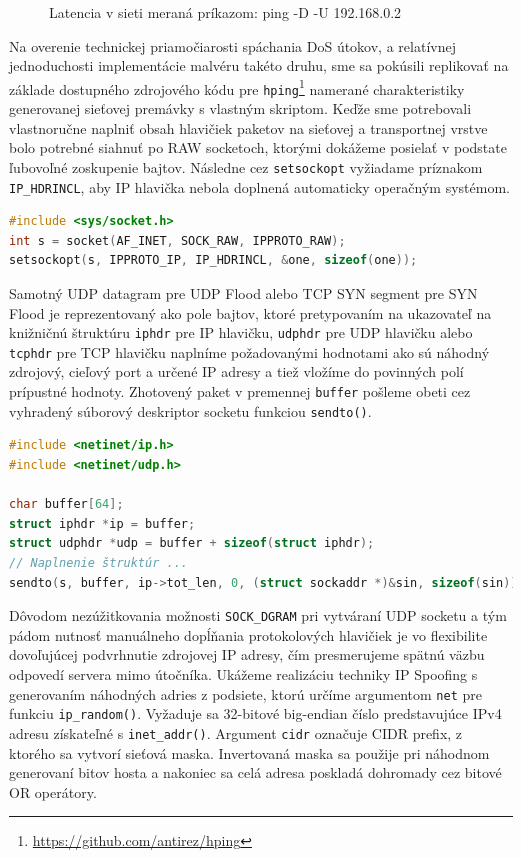 \documentclass[12pt, a4paper]{article}
\begin{document}
\begin{figure}[h!]
\begin{subfigure}[t]{.32\textwidth}
	\end{subfigure}
	\caption{Latencia v sieti meraná príkazom: ping -D -U 192.168.0.2}
	\label{latency-graphs}
\end{figure}

Na overenie technickej priamočiarosti spáchania DoS útokov, a relatívnej jednoduchosti
implementácie malvéru takéto druhu, sme sa pokúsili replikovať na základe dostupného zdrojového
kódu pre \verb|hping|\footnote{\url{https://github.com/antirez/hping}} namerané charakteristiky 
generovanej sieťovej premávky s vlastným skriptom. Keďže sme potrebovali vlastnoručne naplniť obsah hlavičiek
paketov na sieťovej a transportnej vrstve bolo potrebné siahnuť po RAW socketoch, ktorými dokážeme posielať
v podstate ľubovoľné zoskupenie bajtov. Následne cez \verb|setsockopt| vyžiadame príznakom \verb|IP_HDRINCL|,
aby IP hlavička nebola doplnená automaticky operačným systémom.

\begin{lstlisting}[caption=Otvorenie RAW Socket bez dopĺňania IP hlavičky, language=C]
#include <sys/socket.h>
int s = socket(AF_INET, SOCK_RAW, IPPROTO_RAW);
setsockopt(s, IPPROTO_IP, IP_HDRINCL, &one, sizeof(one));
\end{lstlisting}

Samotný UDP datagram pre UDP Flood alebo TCP SYN segment pre SYN Flood je reprezentovaný ako pole
bajtov, ktoré pretypovaním na ukazovateľ na knižničnú štruktúru \verb|iphdr| pre IP hlavičku, \verb|udphdr| 
pre UDP hlavičku alebo \verb|tcphdr| pre TCP hlavičku naplníme požadovanými hodnotami ako sú náhodný zdrojový, 
cieľový port a určené IP adresy a tiež vložíme do povinných polí prípustné hodnoty. Zhotovený paket
v premennej \verb|buffer| pošleme obeti cez vyhradený súborový deskriptor socketu funkciou \verb|sendto()|.

\begin{lstlisting}[caption=Poslanie UDP datagramov cez RAW Socket na Linuxe, language=C]
#include <netinet/ip.h>
#include <netinet/udp.h>

char buffer[64];
struct iphdr *ip = buffer;
struct udphdr *udp = buffer + sizeof(struct iphdr);
// Naplnenie štruktúr ...
sendto(s, buffer, ip->tot_len, 0, (struct sockaddr *)&sin, sizeof(sin));
\end{lstlisting}

Dôvodom nezúžitkovania možnosti \verb|SOCK_DGRAM| pri vytváraní UDP socketu a tým pádom nutnosť
manuálneho dopĺňania protokolových hlavičiek je vo flexibilite dovoľujúcej podvrhnutie zdrojovej
IP adresy, čím presmerujeme spätnú väzbu odpovedí servera mimo útočníka. Ukážeme realizáciu 
techniky IP Spoofing s generovaním náhodných adries z podsiete, ktorú určíme argumentom \verb|net|
pre funkciu \verb|ip_random()|. Vyžaduje sa 32-bitové big-endian číslo predstavujúce IPv4 adresu
získateľné s \verb|inet_addr()|. Argument \verb|cidr| označuje CIDR prefix, z ktorého sa vytvorí
sieťová maska. Invertovaná maska sa použije pri náhodnom generovaní bitov hosta a nakoniec sa
celá adresa poskladá dohromady cez bitové OR operátory.
\end{document}
